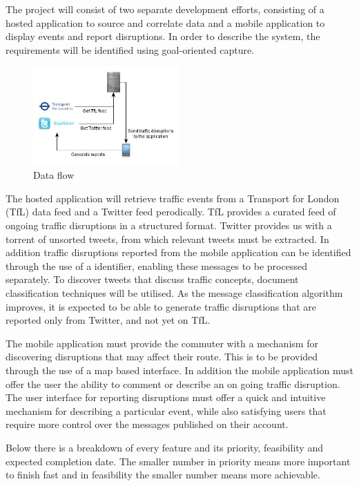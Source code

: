 The project will consist of two separate development efforts, consisting of a
hosted application to source and correlate data and a mobile application to
display events and report disruptions. In order to describe the system, the
requirements will be identified using goal-oriented capture\cite{Requirements}.

\begin{figure}[here]
\begin{center}
\includegraphics[width=0.5\textwidth]{images/draft_architecture.jpg}
\end{center}
\vspace{-20pt}
\caption{Data flow}
\end{figure}

The hosted application will retrieve traffic events from a Transport for London
(TfL) data feed and a Twitter feed perodically. TfL provides a curated feed of
ongoing traffic disruptions in a structured format. Twitter provides us with a
torrent of unsorted tweets, from which relevant tweets must be extracted. In
addition traffic disruptions reported from the mobile application can be
identified through the use of a identifier, enabling these messages to be
processed separately. To discover tweets that discuss traffic concepts,
document classification techniques will be utilised. As the message
classification algorithm improves, it is expected to be able to generate traffic disruptions that are reported only from Twitter, and not yet on TfL.

The mobile application must provide the commuter with a mechanism for discovering disruptions that may affect their route. This is to be provided through the use of a map based interface. In addition the mobile application must offer the user the ability to comment or describe an on going traffic disruption. The user interface for reporting disruptions must offer a quick and intuitive mechanism for describing a particular event, while also satisfying users that require more control over the messages published on their account.

Below there is a breakdown of every feature and its priority, feasibility and expected completion date. The smaller number in priority means more important to finish fast and in feasibility the smaller number means more achievable.

